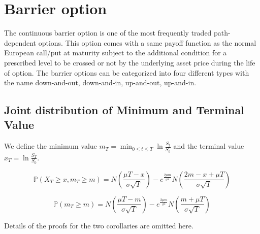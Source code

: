 \section{Barrier option}
The continuous barrier option is one of the most frequently traded path-dependent options. This option comes with a same payoff function as the normal European call/put at maturity subject to the additional condition for a prescribed level to be crossed or not by the underlying asset price during the life of option. The barrier options can be categorized into four different types with the name down-and-out, down-and-in, up-and-out, up-and-in.
\subsection{Joint distribution of Minimum and Terminal Value}
We define the minimum value $\displaystyle m_{T} = \min_{0 \le t \le T} \ln{\frac{S_{t}}{S_{0}}}$ and the terminal value $x_{T} = \ln{\frac{S_{T}}{S_{0}}}$.\\
\begin{corollary}
$$\mathbb{P}(X_{T} \ge x, m_{T} \ge m) = N(\frac{\mu T - x}{\sigma \sqrt{T}}) - e^{\frac{2\mu m}{\sigma^{2}}}N(\frac{2m-x+\mu T}{\sigma \sqrt{T}})$$
\end{corollary}
\begin{corollary}
$$\mathbb{P}(m_{T} \ge m) = N(\frac{\mu T - m}{\sigma \sqrt{T}}) - e^{\frac{2\mu m}{\sigma^{2}}}N(\frac{m+\mu T}{\sigma \sqrt{T}})$$
\end{corollary}
Details of the proofs for the two corollaries are omitted here.
\newpage

